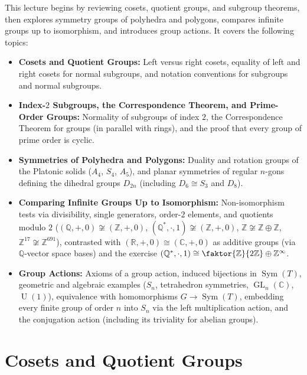 \begin{overview}
This lecture begins by reviewing cosets, quotient groups, and subgroup theorems, then explores symmetry groups of polyhedra and polygons, compares infinite groups up to isomorphism, and introduces group actions. It covers the following topics:
\begin{itemize}
    \item \textbf{Cosets and Quotient Groups:} Left versus right cosets, equality of left and right cosets for normal subgroups, and notation conventions for subgroups and normal subgroups.
    \item \textbf{Index-$2$ Subgroups, the Correspondence Theorem, and Prime-Order Groups:} Normality of subgroups of index $2$, the Correspondence Theorem for groups (in parallel with rings), and the proof that every group of prime order is cyclic.
    \item \textbf{Symmetries of Polyhedra and Polygons:} Duality and rotation groups of the Platonic solids ($A_4$, $S_4$, $A_5$), and planar symmetries of regular $n$-gons defining the dihedral groups $D_{2n}$ (including $D_6 \cong S_3$ and $D_8$).
    \item \textbf{Comparing Infinite Groups Up to Isomorphism:} Non-isomorphism tests via divisibility, single generators, order-$2$ elements, and quotients modulo $2$ ($(\mathbb{Q},+,0) \not\cong (\mathbb{Z},+,0)$, $(\mathbb{Q}^*,\cdot,1) \not\cong (\mathbb{Z},+,0)$, $\mathbb{Z} \not\cong \mathbb{Z} \oplus \mathbb{Z}$, $\mathbb{Z}^{17} \not\cong \mathbb{Z}^{691}$), contrasted with $(\mathbb{R},+,0) \cong (\mathbb{C},+,0)$ as additive groups (via $\mathbb{Q}$-vector space bases) and the exercise $(\mathbb{Q}^*,\cdot,1) \cong \faktor{\mathbb{Z}}{2\mathbb{Z}} \oplus \mathbb{Z}^\infty$.
    \item \textbf{Group Actions:} Axioms of a group action, induced bijections in $\operatorname{Sym}(T)$, geometric and algebraic examples ($S_n$, tetrahedron symmetries, $\operatorname{GL}_n(\mathbb{C})$, $\operatorname{U}(1)$), equivalence with homomorphisms $G \to \operatorname{Sym}(T)$, embedding every finite group of order $n$ into $S_n$ via the left multiplication action, and the conjugation action (including its triviality for abelian groups).
\end{itemize}
\end{overview}

\section{Cosets and Quotient Groups}

